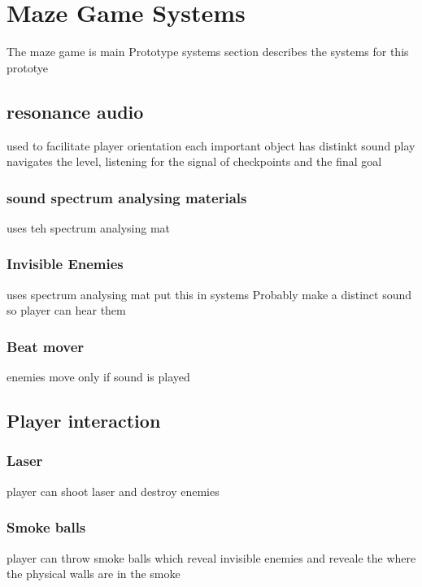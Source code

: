 
\chapter{Maze Game Systems}
The maze game is main Prototype
systems section describes the systems for this prototye

\section{resonance audio}
used to facilitate player orientation
each important object has distinkt sound
play navigates the level, listening for the signal of checkpoints and the final goal



\subsection{sound spectrum analysing materials}
uses teh spectrum analysing mat


\subsection{Invisible Enemies}
uses spectrum analysing mat
put this in systems Probably
make a distinct sound so player can hear them



\subsection{Beat mover}
enemies move only if sound is played



\section{Player interaction}
\subsection{Laser}
player can shoot laser and destroy enemies

\subsection{Smoke balls}
player can throw smoke balls which reveal invisible enemies and reveale the where the physical walls are in the smoke


